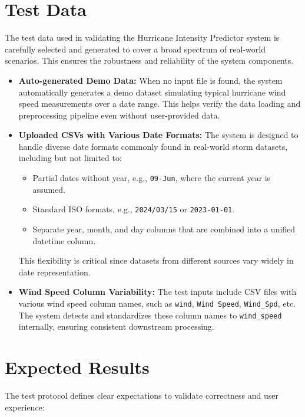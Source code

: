 \section{Test Data}
The test data used in validating the Hurricane Intensity Predictor system is carefully selected and generated to cover a broad spectrum of real-world scenarios. This ensures the robustness and reliability of the system components.

\begin{itemize}
	\item \textbf{Auto-generated Demo Data:}  
	When no input file is found, the system automatically generates a demo dataset simulating typical hurricane wind speed measurements over a date range. This helps verify the data loading and preprocessing pipeline even without user-provided data.
	
	\item \textbf{Uploaded CSVs with Various Date Formats:}  
	The system is designed to handle diverse date formats commonly found in real-world storm datasets, including but not limited to:
	\begin{itemize}
		\item Partial dates without year, e.g., \texttt{09-Jun}, where the current year is assumed.
		\item Standard ISO formats, e.g., \texttt{2024/03/15} or \texttt{2023-01-01}.
		\item Separate year, month, and day columns that are combined into a unified datetime column.
	\end{itemize}
	This flexibility is critical since datasets from different sources vary widely in date representation.
	
	\item \textbf{Wind Speed Column Variability:}  
	The test inputs include CSV files with various wind speed column names, such as \texttt{wind}, \texttt{Wind Speed}, \texttt{Wind\_Spd}, etc. The system detects and standardizes these column names to \texttt{wind\_speed} internally, ensuring consistent downstream processing.
\end{itemize}

\section{Expected Results}
The test protocol defines clear expectations to validate correctness and user experience:

